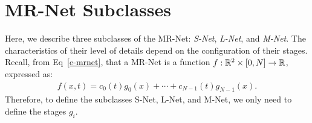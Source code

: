 






\section{MR-Net Subclasses}

Here, we describe three subclasses of the MR-Net: \emph{S-Net}, \emph{L-Net}, and \emph{M-Net}.
The characteristics of their level of details depend on the configuration of their stages. %
Recall, from Eq~\ref{e-mrnet}, that a MR-Net is a function $f:\mathbb{R}^2\times [0,N]\to \mathbb{R}$, expressed as:
\begin{align*}
f(x,t) = c_0(t)g_0(x) + \cdots + c_{N-1}(t)g_{N-1}(x).
\end{align*}
Therefore, to define the subclasses S-Net, L-Net, and M-Net, we only need to define the stages $g_i$.


